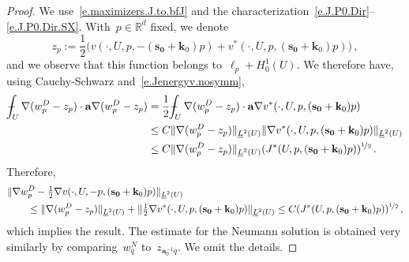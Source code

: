 \documentclass[11pt,twoside]{article} %
\numberwithin{equation}{section}
\theoremstyle{definition}
\newcommand*{\Rd}{\ensuremath{\mathbb{R}^d}}
\newcommand{\s}{\mathbf{s}}
\renewcommand{\a}{\mathbf{a}}
\renewcommand{\k}{\mathbf{k}}
\newcommand{\bfzero}{\boldsymbol{0}}
\def\Xint#1{\mathchoice
{\XXint\displaystyle\textstyle{#1}}%
{\XXint\textstyle\scriptstyle{#1}}%
{\XXint\scriptstyle\scriptscriptstyle{#1}}%
{\XXint\scriptscriptstyle\scriptscriptstyle{#1}}%
\!\int}
\def\XXint#1#2#3{{\setbox0=\hbox{$#1{#2#3}{\int}$}
\vcenter{\hbox{$#2#3$}}\kern-.5\wd0}}
\def\fint{\Xint-}
\begin{document}
\begin{proof}
We use~\eqref{e.maximizers.J.to.bfJ} and the characterization~\eqref{e.J.P0.Dir}--\eqref{e.J.P0.Dir.SX}. With~$p\in \Rd$ fixed, we denote 
\begin{equation*}
z_p:= \frac12 ( v (\cdot,U,p,-(\s_{\bfzero} +\k_0)p )
+ 
v^*(\cdot,U,p,(\s_{\bfzero} +\k_0)p) \bigr) \,,
\end{equation*}
and we observe that this function belongs to~$\ell_p + H^1_0 (U)$. 
We therefore have, using Cauchy-Schwarz and~\eqref{e.Jenergyv.nosymm},  
\begin{align*}
\fint_U \nabla ( w_p^D - z_p) \cdot \a \nabla ( w_p^D - z_p)
&
=
\frac12 \fint_U \nabla ( w_p^D - z_p) \cdot \a \nabla v^*(\cdot,U,p,(\s_{\bfzero} +\k_0)p) 
\notag \\ &
\leq
C \| \nabla ( w_p^D - z_p) \|_{\underline{L}^2(U)} 
\| \nabla v^*(\cdot,U,p,(\s_{\bfzero}+\k_0)p) \|_{\underline{L}^2(U)}
\notag \\ &
\leq
C \| \nabla ( w_p^D - z_p) \|_{\underline{L}^2(U)} 
( J^*(U,p,(\s_{\bfzero}+\k_0)p))^{\nicefrac12} \,.
\end{align*}
Therefore, 
\begin{align*}
\lefteqn{
\| \nabla w^D_p - \tfrac12\nabla v(\cdot,U,-p, (\s_{\bfzero}+\k_0) p) \|_{\underline{L}^2(U)} 
} \qquad & 
\notag \\ & 
\leq
\| \nabla (w^D_p - z_p) \|_{\underline{L}^2(U)} 
+
\|\tfrac12 \nabla v^*(\cdot,U,p,(\s_{\bfzero}+\k_0)p) \|_{\underline{L}^2(U)}
\leq 
C( J^*(U,p,(\s_{\bfzero}+\k_0)p))^{\nicefrac12} \,,
\end{align*}
which implies the result. 
The estimate for the Neumann solution is obtained very similarly by comparing~$w_q^N$ to~$z_{\a_0^{-1}q}$. We omit the details. 

\smallskip


\end{proof}
\end{document}
